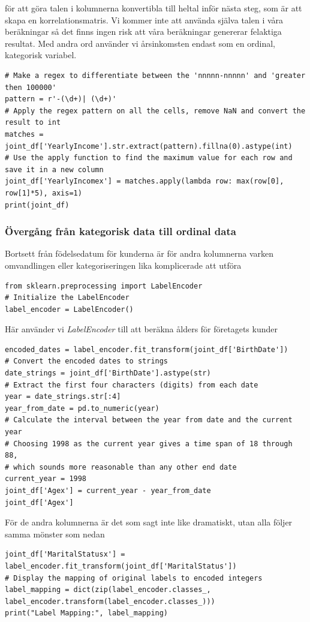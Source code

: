 \documentclass[]{article}
\begin{document}
för att göra talen i kolumnerna konvertibla till heltal inför nästa steg, som är att skapa en korrelationsmatris. Vi kommer inte att använda själva talen i våra beräkningar så det finns ingen risk att våra beräkningar genererar felaktiga resultat. Med andra ord använder vi årsinkomsten endast som en ordinal, kategorisk variabel.
\begin{lstlisting}
# Make a regex to differentiate between the 'nnnnn-nnnnn' and 'greater then 100000'
pattern = r'-(\d+)| (\d+)'
# Apply the regex pattern on all the cells, remove NaN and convert the result to int
matches = joint_df['YearlyIncome'].str.extract(pattern).fillna(0).astype(int)
# Use the apply function to find the maximum value for each row and save it in a new column
joint_df['YearlyIncomex'] = matches.apply(lambda row: max(row[0], row[1]*5), axis=1)
print(joint_df)
\end{lstlisting}

\subsubsection{Övergång från kategorisk data till ordinal data}

Bortsett från födelsedatum för kunderna är för andra kolumnerna varken omvandlingen eller kategoriseringen lika komplicerade att utföra
\begin{lstlisting}
from sklearn.preprocessing import LabelEncoder
# Initialize the LabelEncoder
label_encoder = LabelEncoder()
\end{lstlisting}
Här använder vi \emph{LabelEncoder} till att beräkna ålders för företagets kunder
\begin{lstlisting}
encoded_dates = label_encoder.fit_transform(joint_df['BirthDate'])
# Convert the encoded dates to strings
date_strings = joint_df['BirthDate'].astype(str)
# Extract the first four characters (digits) from each date
year = date_strings.str[:4]
year_from_date = pd.to_numeric(year)
# Calculate the interval between the year from date and the current year
# Choosing 1998 as the current year gives a time span of 18 through 88,
# which sounds more reasonable than any other end date
current_year = 1998
joint_df['Agex'] = current_year - year_from_date
joint_df['Agex']
\end{lstlisting}
För de andra kolumnerna är det som sagt inte like dramatiskt, utan alla följer samma mönster som nedan
\begin{lstlisting}
joint_df['MaritalStatusx'] = label_encoder.fit_transform(joint_df['MaritalStatus'])
# Display the mapping of original labels to encoded integers
label_mapping = dict(zip(label_encoder.classes_, label_encoder.transform(label_encoder.classes_)))
print("Label Mapping:", label_mapping)
\end{lstlisting}
\end{document}
